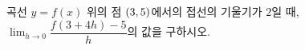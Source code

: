 곡선 $y=f(x)$ 위의 점 $(3{,}\mkern3mu\mathopen{}5)$에서의 접선의 기울기가 $2$일 때, $\displaystyle\lim_{h\to 0}\dfrac{f(3+4h)-5}{h}$의 값을 구하시오.
